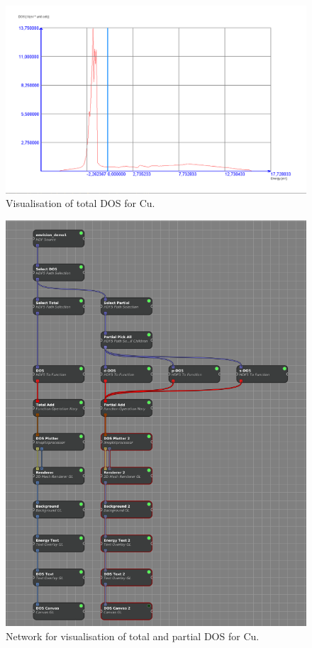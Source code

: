 \documentclass[a4paper,12pt]{article}
\begin{document}
\begin{figure}[H]
    \centering
    \includegraphics[scale=0.35]{screenshot_total_dos_Cu_1_10.png}
    \caption{Visualisation of total DOS for Cu.}
    \label{fig:total_dos}
\end{figure}

\begin{figure}[H]
    \centering
    \includegraphics[scale=0.4]{screenshot_dos_network_Cu_1_10.png}
    \caption{Network for visualisation of total and partial DOS for Cu.}
    \label{fig:network_dos}
\end{figure}
\end{document}
